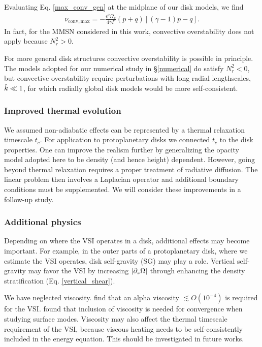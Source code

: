 Evaluating Eq. \ref{max_conv_gen} at the midplane of our disk models,
we find  
\begin{align}
  \nu_\mathrm{conv,max} =
  -\frac{\epsilon^2\Omega_k}{4\gamma\Gamma}\left(p+q\right)
  \left[\left(\gamma-1\right)p-q\right]. \label{max_conv}
\end{align}
In fact, for the MMSN considered in this work, convective
overstability does not apply because 
$N_r^2>0$.   

For more general disk structures convective overstability is
possible in principle. The models adopted for our numerical study in
\S\ref{numerical} do satisfy $N_r^2<0$, but convective overstability
require perturbations with long radial lengthscales,
$\hat{k}\ll 1$, for which radially global disk models would be more 
self-consistent. 

\subsubsection{Improved thermal evolution} 
We assumed non-adiabatic effects can be represented by a thermal
relaxation timescale $t_c$. For  
application to protoplanetary disks we connected $t_c$ to the disk
properties. One can improve the realism further by generalizing the 
opacity model adopted here to be density (and hence height) dependent. 
However, going beyond thermal relaxation requires a
proper treatment of radiative diffusion. The linear problem then
involves a Laplacian operator and additional boundary
conditions must be supplemented. We will consider these improvements in a
follow-up study. %
 
\subsubsection{Additional physics} 
Depending on where the VSI operates in a
disk, additional effects may become important. For example, in the
outer parts of a protoplanetary disk, where we estimate the VSI 
operates, disk self-gravity (SG) may play a role. Vertical
self-gravity may favor the VSI by increasing $|\partial_z\Omega|$ through
enhancing the density stratification 
(Eq. \ref{vertical_shear}). %

We have neglected viscosity. \cite{nelson13} find that an alpha
viscosity $\lesssim O(10^{-4})$ is required for the
VSI. \cite{barker15} found that inclusion of viscosity is needed for 
convergence when studying surface modes. Viscosity may also affect the
thermal timescale requirement of the VSI, because viscous heating
needs to be self-consistently included in the energy equation. This
should be investigated in future works.   




